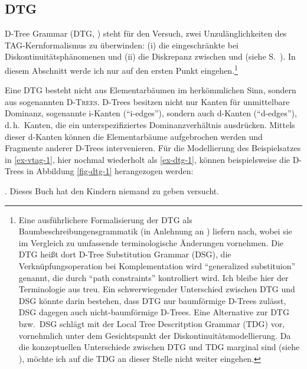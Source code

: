 \subsection{DTG} \label{sec-dtg}

D-Tree Grammar (DTG, \citealt{Rambow:etal:95}) steht für den Versuch, zwei Unzulänglichkeiten des TAG-Kernformalismus zu überwinden: (i) die eingeschränkte  bei Diskontinuitätsphänomenen und (ii) die Diskrepanz zwischen  und  (siehe S.~\pageref{sec-ableitungsbaum}). In diesem Abschnitt werde ich nur auf den ersten Punkt eingehen.\footnote{Eine ausführlichere Formalisierung der DTG als Baumbeschreibungensgrammatik (in Anlehnung an \citealt{Vijay-Shanker:92}) liefern \cite{Rambow:etal:01} nach, wobei sie im Vergleich zu \cite{Rambow:etal:95} umfassende terminologische Änderungen vornehmen. Die DTG hei\ss t dort D-Tree Substitution Grammar (DSG), die Verknüpfungsoperation bei Komplementation wird "`generalized substituion"' genannt, die durch "`path constraints"' kontrolliert wird. Ich bleibe hier der Terminologie aus \cite{Rambow:etal:95} treu. Ein schwerwiegender Unterschied zwischen DTG und DSG könnte darin bestehen, dass DTG nur baumförmige D-Trees zulässt, DSG dagegen auch nicht-baumförmige D-Trees. Eine Alternative zur DTG bzw.\ DSG schlägt \cite{Kallmeyer:01} mit der Local Tree Descritption Grammar (TDG) vor, vornehmlich unter dem Gesichtspunkt der Diskontinuitätsmodellierung. Da die konzeptuellen Unterschiede zwischen DTG und TDG marginal sind (siehe \citealt[118]{Rambow:etal:01}), möchte ich auf die TDG an dieser Stelle nicht weiter eingehen.}

Eine DTG besteht nicht aus Elementarbäumen im herkömmlichen Sinn, sondern aus sogenannten \textsc{D-Trees}. D-Trees besitzen nicht nur Kanten für unmittelbare Dominanz, sogenannte i-Kanten ("`i-edges"'), sondern auch d-Kanten ("`d-edges"'), d.\,h.\ Kanten, die ein unterspezifiziertes Dominanzverhältnis ausdrücken. Mittels dieser d-Kanten können die Elementarbäume aufgebrochen werden und Fragmente anderer D-Trees intervenieren. Für die Modellierung des Beispielsatzes in \ref{ex-vtag-1}, hier nochmal wiederholt als \ref{ex-dtg-1}, können beispielsweise die D-Trees in Abbildung \ref{fig-dtg-1} herangezogen werden: 

\ex. {Dieses Buch} hat {den Kindern} niemand {zu geben} versucht. \label{ex-dtg-1}

